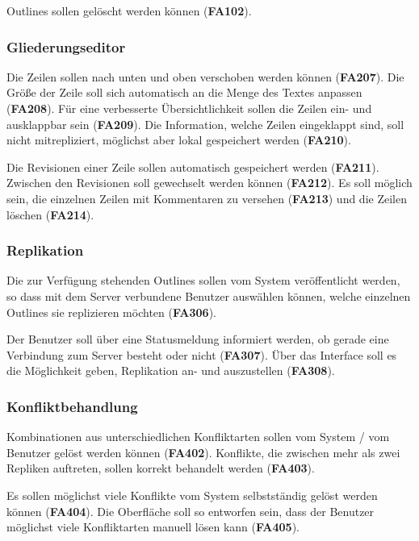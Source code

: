 Outlines sollen gelöscht werden können (\textbf{FA102}).

\subsubsection{Gliederungseditor}

Die Zeilen sollen nach unten und oben verschoben werden können (\textbf{FA207}). Die Größe der Zeile soll sich automatisch an die Menge des Textes anpassen (\textbf{FA208}). Für eine verbesserte Übersichtlichkeit sollen die Zeilen ein- und ausklappbar sein (\textbf{FA209}). Die Information, welche Zeilen eingeklappt sind, soll nicht mitrepliziert, möglichst aber lokal gespeichert werden (\textbf{FA210}).

Die Revisionen einer Zeile sollen automatisch gespeichert werden (\textbf{FA211}). Zwischen den Revisionen soll gewechselt werden können (\textbf{FA212}). Es soll möglich sein, die einzelnen Zeilen mit Kommentaren zu versehen (\textbf{FA213}) und die Zeilen löschen (\textbf{FA214}).

\subsubsection{Replikation}

Die zur Verfügung stehenden Outlines sollen vom System veröffentlicht werden, so dass mit dem Server verbundene Benutzer auswählen können, welche einzelnen Outlines sie replizieren möchten (\textbf{FA306}).

Der Benutzer soll über eine Statusmeldung informiert werden, ob gerade eine Verbindung zum Server besteht oder nicht (\textbf{FA307}). Über das Interface soll es die Möglichkeit geben, Replikation an- und auszustellen (\textbf{FA308}). 

\subsubsection{Konfliktbehandlung}

Kombinationen aus unterschiedlichen Konfliktarten sollen vom System / vom Benutzer gelöst werden können (\textbf{FA402}). Konflikte, die zwischen mehr als zwei Repliken auftreten, sollen korrekt behandelt werden (\textbf{FA403}).

Es sollen möglichst viele Konflikte vom System selbstständig gelöst werden können (\textbf{FA404}). Die Oberfläche soll so entworfen sein, dass der Benutzer möglichst viele Konfliktarten manuell lösen kann (\textbf{FA405}).


